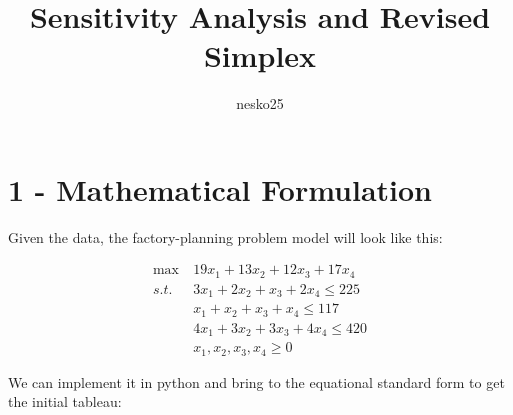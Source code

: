 \documentclass[
  letterpaper,
  DIV=11,
  numbers=noendperiod]{scrartcl}
\title{Sensitivity Analysis and Revised Simplex}
\author{nesko25}
\date{}
\begin{document}
\maketitle


\section{1 - Mathematical Formulation}\label{mathematical-formulation}

Given the data, the factory-planning problem model will look like this:

\[
\begin{aligned}
\max \  & 19x_1 + 13x_2 + 12x_3 + 17x_4 \\
s.t. \ & 3x_1 + 2x_2 + x_3 + 2x_4 \le 225 \\
& x_1 + x_2 + x_3 + x_4 \le 117 \\
& 4x_1 + 3x_2 + 3x_3 + 4x_4 \le 420 \\
& x_1, x_2, x_3, x_4 \ge 0
\end{aligned}
\]

We can implement it in python and bring to the equational standard form
to get the initial tableau:
\end{document}
